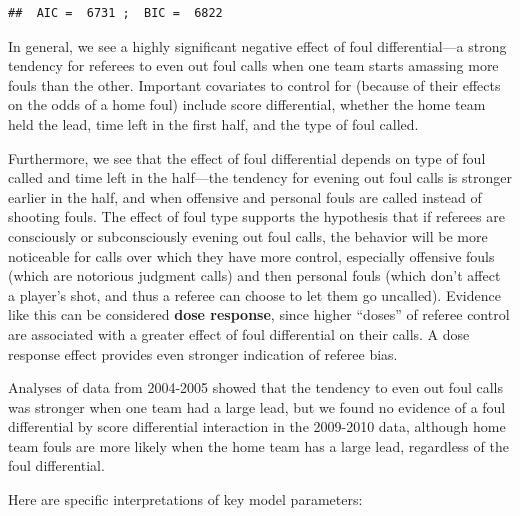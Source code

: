 \documentclass[
]{krantz}
\begin{document}
\begin{verbatim}
##  AIC =  6731 ;  BIC =  6822
\end{verbatim}

In general, we see a highly significant negative effect of foul differential---a strong tendency for referees to even out foul calls when one team starts amassing more fouls than the other. Important covariates to control for (because of their effects on the odds of a home foul) include score differential, whether the home team held the lead, time left in the first half, and the type of foul called.

Furthermore, we see that the effect of foul differential depends on type of foul called and time left in the half---the tendency for evening out foul calls is stronger earlier in the half, and when offensive and personal fouls are called instead of shooting fouls. The effect of foul type supports the hypothesis that if referees are consciously or subconsciously evening out foul calls, the behavior will be more noticeable for calls over which they have more control, especially offensive fouls (which are notorious judgment calls) and then personal fouls (which don't affect a player's shot, and thus a referee can choose to let them go uncalled). Evidence like this can be considered \textbf{dose response},  since higher ``doses'' of referee control are associated with a greater effect of foul differential on their calls. A dose response effect provides even stronger indication of referee bias.

Analyses of data from 2004-2005 \citep{Noecker2012} showed that the tendency to even out foul calls was stronger when one team had a large lead, but we found no evidence of a foul differential by score differential interaction in the 2009-2010 data, although home team fouls are more likely when the home team has a large lead, regardless of the foul differential.

Here are specific interpretations of key model parameters:
\end{document}
